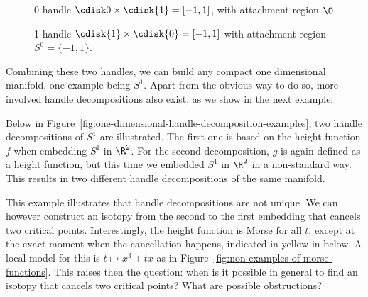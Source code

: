 \begin{description}
    \item[] 0-handle $\cdisk0 \times \cdisk{1} = [-1, 1]$, with attachment region $\O$.
        
    \item[] 1-handle   $\cdisk{1} \times  \cdisk{0} = [-1, 1]$ with attachment region $S^{0} = \{-1, 1\}$.
\end{description}
Combining these two handles, we can build any compact one dimensional manifold, one example being $S^{1}$. 
Apart from the obvious way to do so, more involved handle decompositions also exist, as we show in the next example:

\begin{eg}
    Below in Figure~\ref{fig:one-dimensional-handle-decomposition-examples}, two handle decompositions of $S^{1}$ are illustrated.
    The first one is based on the height function $f$ when embedding $S^{1}$ in $\R^2$.
    For the second decomposition, $g$ is again defined as a height function, but this time we embedded $S^{1}$ in $ \R^2$ in a non-standard way.
    This results in two different handle decompositions of the same manifold.
\end{eg}
\begin{figure}[H]
    \centering
\end{figure}
This example illustrates that handle decompositions are not unique.
We can however construct an isotopy from the second to the first embedding that cancels two critical points.
Interestingly, the height function is Morse for all $t$, except at the exact moment when the cancellation happens, indicated in yellow in below.
A local model for this is $t\mapsto x^3 + tx$ as in Figure~\ref{fig:non-examples-of-morse-functions}.
This raises then the question: when is it possible in general to find an isotopy that cancels two critical points? What are possible obstructions?
\begin{figure}[H]
    \centering
\end{figure}


